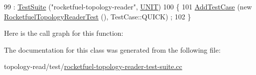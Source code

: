\begin{DoxyCode}
99   : \hyperlink{classns3_1_1TestSuite_a904b0c40583b744d30908aeb94636d1a}{TestSuite} (\textcolor{stringliteral}{"rocketfuel-topology-reader"}, \hyperlink{classns3_1_1TestSuite_a1ebfcab34ec8161e085e8e3a1855eae0a3885375a3787abf60431f8454b3cadbd}{UNIT})
100 \{
101   \hyperlink{classns3_1_1TestCase_a3718088e3eefd5d6454569d2e0ddd835}{AddTestCase} (\textcolor{keyword}{new} \hyperlink{classRocketfuelTopologyReaderTest}{RocketfuelTopologyReaderTest} (), TestCase::QUICK)
      ;
102 \}
\end{DoxyCode}


Here is the call graph for this function\+:




The documentation for this class was generated from the following file\+:\begin{DoxyCompactItemize}
\item 
topology-\/read/test/\hyperlink{rocketfuel-topology-reader-test-suite_8cc}{rocketfuel-\/topology-\/reader-\/test-\/suite.\+cc}\end{DoxyCompactItemize}
